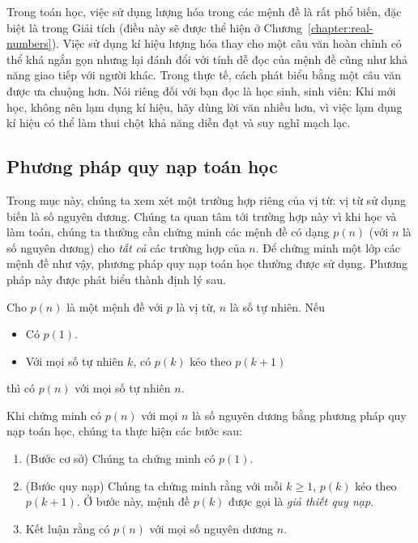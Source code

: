 Trong toán học, việc sử dụng lượng hóa trong các mệnh đề là rất phổ biến, đặc biệt là trong Giải tích (điều này sẽ được thể hiện ở Chương~\ref{chapter:real-numbers}). Việc sử dụng kí hiệu lượng hóa thay cho một câu văn hoàn chỉnh có thể khá ngắn gọn nhưng lại đánh đổi với tính dễ đọc của mệnh đề cũng như khả năng giao tiếp với người khác. Trong thực tế, cách phát biểu bằng một câu văn được ưa chuộng hơn. Nói riêng đối với bạn đọc là học sinh, sinh viên: Khi mới học, không nên lạm dụng kí hiệu, hãy dùng lời văn nhiều hơn, vì việc lạm dụng kí hiệu có thể làm thui chột khả năng diễn đạt và suy nghĩ mạch lạc.

\subsection{Phương pháp quy nạp toán học}

Trong mục này, chúng ta xem xét một trường hợp riêng của vị từ: vị từ sử dụng biến là số nguyên dương. Chúng ta quan tâm tới trường hợp này vì khi học và làm toán, chúng ta thường cần chứng minh các mệnh đề có dạng $p(n)$ (với $n$ là số nguyên dương) cho \textit{tất cả} các trường hợp của $n$. Để chứng minh một lớp các mệnh đề như vậy, phương pháp quy nạp toán học thường được sử dụng. Phương pháp này được phát biểu thành định lý sau.

\bigskip

\begin{theorem}
    Cho $p(n)$ là một mệnh đề với $p$ là vị từ, $n$ là số tự nhiên. Nếu
    \begin{itemize}
        \item Có $p(1)$.
        \item Với mọi số tự nhiên $k$, có $p(k)$ kéo theo $p(k + 1)$
    \end{itemize}

    thì có $p(n)$ với mọi số tự nhiên $n$.
\end{theorem}

Khi chứng minh có $p(n)$ với mọi $n$ là số nguyên dương bằng phương pháp quy nạp toán học, chúng ta thực hiện các bước sau:

\begin{enumerate}[label={\textbf{Bước \arabic*.}},itemindent=1cm]
    \item (Bước cơ sở) Chúng ta chứng minh có $p(1)$.
    \item (Bước quy nạp) Chúng ta chứng minh rằng với mỗi $k\geq 1$, $p(k)$ kéo theo $p(k+1)$. Ở bước này, mệnh đề $p(k)$ được gọi là \textit{giả thiết quy nạp}.
    \item Kết luận rằng có $p(n)$ với mọi số nguyên dương $n$.
\end{enumerate}

